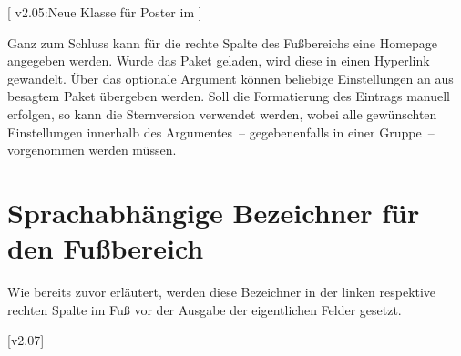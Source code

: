 \begin{DeclareEntity}{}[%
  v2.05:Neue Klasse für Poster im \TUDCD%
]
\begin{Declaration}
  {}
\begin{Declaration}
  {}
\printdeclarationlist
%
Ganz zum Schluss kann für die rechte Spalte des Fußbereichs eine Homepage 
angegeben werden. Wurde das Paket  geladen, wird diese in 
einen Hyperlink gewandelt. Über das optionale Argument können beliebige 
Einstellungen an  aus besagtem Paket übergeben werden. Soll 
die Formatierung des Eintrags manuell erfolgen, so kann die Sternversion 
 verwendet werden, wobei alle gewünschten Einstellungen 
innerhalb des Argumentes~-- gegebenenfalls in einer Gruppe~-- vorgenommen 
werden müssen.%
%
\end{Declaration}
\end{Declaration}



\section{Sprachabhängige Bezeichner für den Fußbereich}
%
\begin{Declaration}
  {}
\begin{Declaration}
  {}
\begin{Declaration}
  {}
%
Wie bereits zuvor erläutert, werden diese Bezeichner in der linken respektive 
rechten Spalte im Fuß vor der Ausgabe der eigentlichen Felder gesetzt.
\TermTable%
\end{Declaration}
\end{Declaration}
\end{Declaration}

[v2.07]
\end{DeclareEntity}
